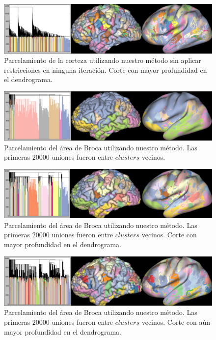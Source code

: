 \begin{figure}[h!]
    \includegraphics[width=\textwidth]{img/all_brain/logit_0_deep.png}
    \caption{Parcelamiento de la corteza utilizando nuestro m\'etodo
             sin aplicar restricciones en ninguna iteraci\'on. Corte con
             mayor profundidad en el dendrograma.}
    \label{fig:nosotros_corteza1}
\end{figure}

\begin{figure}[h!]
    \includegraphics[width=\textwidth]{img/all_brain/logit_20000.png}
    \caption{Parcelamiento del \'area de Broca utilizando nuestro m\'etodo.
             Las primeras $20000$ uniones fueron entre $clusters$
             vecinos.}    
    \label{fig:nosotros_corteza2}
\end{figure}

\begin{figure}[h!]
    \includegraphics[width=\textwidth]{img/all_brain/logit_20000_deep0.png}
    \caption{Parcelamiento del \'area de Broca utilizando nuestro m\'etodo.
             Las primeras $20000$ uniones fueron entre $clusters$
             vecinos. Corte con mayor profundidad en el dendrograma. }    
    \label{fig:nosotros_corteza3}
\end{figure}

\begin{figure}[h!]
    \includegraphics[width=\textwidth]{img/all_brain/logit_20000_deep1.png}
    \caption{Parcelamiento del \'area de Broca utilizando nuestro m\'etodo.
             Las primeras $20000$ uniones fueron entre $clusters$
             vecinos. Corte con a\'un mayor profundidad en el
             dendrograma. }    
    \label{fig:nosotros_corteza4}
\end{figure}


